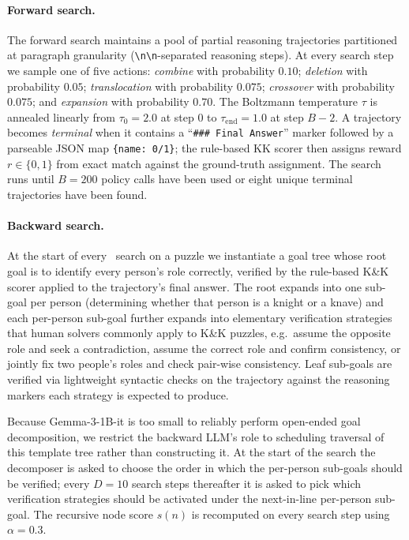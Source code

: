 \paragraph{Forward search.}
The forward search maintains a pool of partial reasoning trajectories
partitioned at paragraph granularity (\verb|\n\n|-separated reasoning
steps). At every search step we sample one of five actions:
\emph{combine} with probability $0.10$; \emph{deletion} with probability $0.05$; \emph{translocation} with probability $0.075$; \emph{crossover}
with probability $0.075$; and \emph{expansion}
with probability $0.70$.
The Boltzmann temperature $\tau$ is annealed linearly from
$\tau_0=2.0$ at step $0$ to $\tau_\mathrm{end}=1.0$ at step $B{-}2$.
A trajectory becomes \emph{terminal} when it contains a
``\verb|### Final Answer|'' marker followed by a parseable JSON map
\verb|{name: 0/1}|; the rule-based KK scorer then assigns reward
$r\in\{0,1\}$ from exact match against the ground-truth assignment. The
search runs until $B=200$ policy calls have been used or eight unique
terminal trajectories have been found.


\paragraph{Backward search.}
At the start of every \ours\ search on a puzzle we instantiate a goal
tree whose root goal is to identify every person's role correctly,
verified by the rule-based K\&K scorer applied to the trajectory's
final answer. The root expands into one sub-goal per person (determining whether that person is a knight or a knave) and each
per-person sub-goal further expands into elementary verification
strategies that human solvers commonly apply to K\&K puzzles, e.g.\
assume the opposite role and seek a contradiction, assume the correct
role and confirm consistency, or jointly fix two people's roles and
check pair-wise consistency. Leaf sub-goals are verified via
lightweight syntactic checks on the trajectory against the reasoning
markers each strategy is expected to produce.

Because Gemma-3-1B-it is too small to reliably perform open-ended goal
decomposition, we restrict the backward LLM's
role to scheduling traversal of this template tree rather than
constructing it. At the start of the search the decomposer is asked to
choose the order in which the per-person sub-goals should be verified;
every $D=10$ search steps thereafter it is asked to pick which
verification strategies should be activated under the next-in-line
per-person sub-goal. 
The recursive node score $s(n)$ is recomputed on every search step using $\alpha=0.3$.

